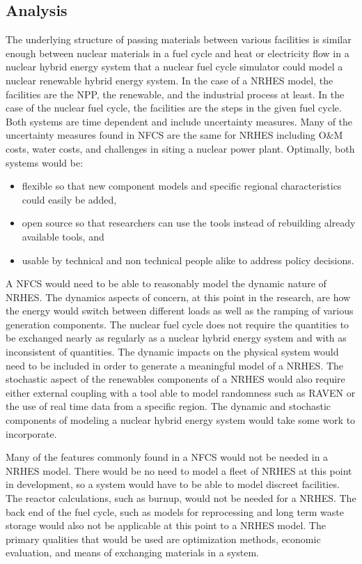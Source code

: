 \documentclass{article}                                                                           %
\begin{document}
\begin{linenumbers}
\section{Analysis}
The underlying structure of passing materials between various facilities is similar enough between nuclear materials in a fuel cycle and heat or electricity flow in a nuclear hybrid energy system that a nuclear fuel cycle simulator could model a nuclear renewable hybrid energy system. In the case of a NRHES model, the facilities are the NPP, the renewable, and the industrial process at least.  In the case of the nuclear fuel cycle, the facilities are the steps in the given fuel cycle. Both systems are time dependent and include uncertainty measures. Many of the uncertainty measures found in NFCS are the same for NRHES including O\&M costs, water costs, and challenges in siting a nuclear power plant. Optimally, both systems would be: 
\begin{itemize}

\item flexible so that new component models and specific regional characteristics could easily be added, 
\item open source so that researchers can use the tools instead of rebuilding already available tools, and 
\item usable by technical and non technical people alike to address policy decisions. 

\end{itemize}
 
A NFCS would need to be able to reasonably model the dynamic nature of NRHES. The dynamics aspects of concern, at this point in the research, are how the energy would switch between different loads as well as the ramping of various generation components.  The nuclear fuel cycle does not require the quantities to be exchanged nearly as regularly as a nuclear hybrid energy system and with as inconsistent of quantities. The dynamic impacts on the physical system would need to be included in order to generate a meaningful model of a NRHES. The stochastic aspect of the renewables components of a NRHES would also require either external coupling with a tool able to model randomness such as RAVEN or the use of real time data from a specific region. The dynamic and stochastic components of modeling a nuclear hybrid energy system would take some work to incorporate. 

Many of the features commonly found in a NFCS would not be needed in a NRHES model.  There would be no need to model a fleet of NRHES at this point in development, so a system would have to be able to model discreet facilities.  The reactor calculations, such as burnup, would not be needed for a NRHES.  The back end of the fuel cycle, such as models for reprocessing and long term waste storage would also not be applicable at this point to a NRHES model.  The primary qualities that would be used are optimization methods, economic evaluation, and means of exchanging materials in a system.  



\end{linenumbers}
\end{document}
